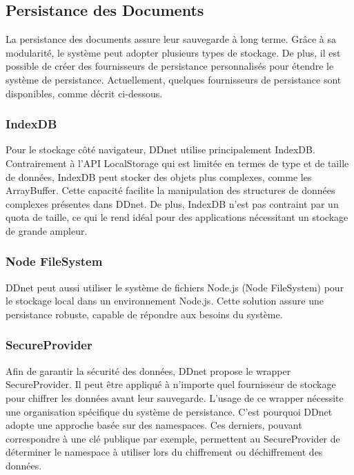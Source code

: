 \subsection{Persistance des Documents}

La persistance des documents assure leur sauvegarde à long terme. Grâce à sa modularité, le système peut adopter plusieurs types de stockage. De plus, il est possible de créer des fournisseurs de persistance personnalisés pour étendre le système de persistance. Actuellement, quelques fournisseurs de persistance sont disponibles, comme décrit ci-dessous.

\subsubsection{IndexDB}

Pour le stockage côté navigateur, \gls{DDnet} utilise principalement IndexDB. Contrairement à l'API LocalStorage qui est limitée en termes de type et de taille de données, IndexDB peut stocker des objets plus complexes, comme les ArrayBuffer. Cette capacité facilite la manipulation des structures de données complexes présentes dans \gls{DDnet}. De plus, IndexDB n'est pas contraint par un quota de taille, ce qui le rend idéal pour des applications nécessitant un stockage de grande ampleur.

\subsubsection{Node FileSystem}

\gls{DDnet} peut aussi utiliser le système de fichiers \gls{Node.js} (Node FileSystem) pour le stockage local dans un environnement \gls{Node.js}. Cette solution assure une persistance robuste, capable de répondre aux besoins du système.

\subsubsection{SecureProvider}

Afin de garantir la sécurité des données, \gls{DDnet} propose le wrapper SecureProvider. Il peut être appliqué à n'importe quel fournisseur de stockage pour chiffrer les données avant leur sauvegarde. L'usage de ce wrapper nécessite une organisation spécifique du système de persistance. C'est pourquoi \gls{DDnet} adopte une approche basée sur des namespaces. Ces derniers, pouvant correspondre à une clé publique par exemple, permettent au SecureProvider de déterminer le namespace à utiliser lors du chiffrement ou déchiffrement des données.

